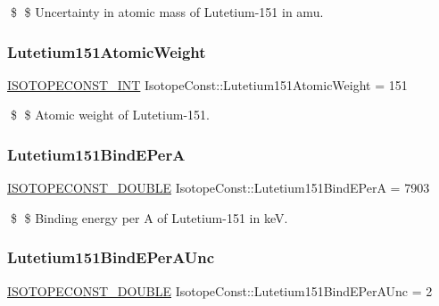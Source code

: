 \$ \$ Uncertainty in atomic mass of Lutetium-\/151 in amu. \mbox{\label{group___isotope_const-_lutetium-_lu151_ga6f138432fa9b2ffe2d679f73cb15fd2b}} 
\subsubsection{\texorpdfstring{Lutetium151\+Atomic\+Weight}{Lutetium151AtomicWeight}}
{\footnotesize\ttfamily \mbox{\hyperlink{group___isotope_const-_macros_ga5f18360b3e99483a35c32d789e62621c}{I\+S\+O\+T\+O\+P\+E\+C\+O\+N\+S\+T\+\_\+\+I\+NT}} Isotope\+Const\+::\+Lutetium151\+Atomic\+Weight = 151}

\$ \$ Atomic weight of Lutetium-\/151. \mbox{\label{group___isotope_const-_lutetium-_lu151_ga0ea593922e5327190d3067fcaf6ff1d2}} 
\subsubsection{\texorpdfstring{Lutetium151\+Bind\+E\+PerA}{Lutetium151BindEPerA}}
{\footnotesize\ttfamily \mbox{\hyperlink{group___isotope_const-_macros_ga8f45a7272ce02c0b4c65c44636ed719a}{I\+S\+O\+T\+O\+P\+E\+C\+O\+N\+S\+T\+\_\+\+D\+O\+U\+B\+LE}} Isotope\+Const\+::\+Lutetium151\+Bind\+E\+PerA = 7903}

\$ \$ Binding energy per A of Lutetium-\/151 in keV. \mbox{\label{group___isotope_const-_lutetium-_lu151_ga5a01ff132cd1c3ab1d8726b499fb2fae}} 
\subsubsection{\texorpdfstring{Lutetium151\+Bind\+E\+Per\+A\+Unc}{Lutetium151BindEPerAUnc}}
{\footnotesize\ttfamily \mbox{\hyperlink{group___isotope_const-_macros_ga8f45a7272ce02c0b4c65c44636ed719a}{I\+S\+O\+T\+O\+P\+E\+C\+O\+N\+S\+T\+\_\+\+D\+O\+U\+B\+LE}} Isotope\+Const\+::\+Lutetium151\+Bind\+E\+Per\+A\+Unc = 2}

